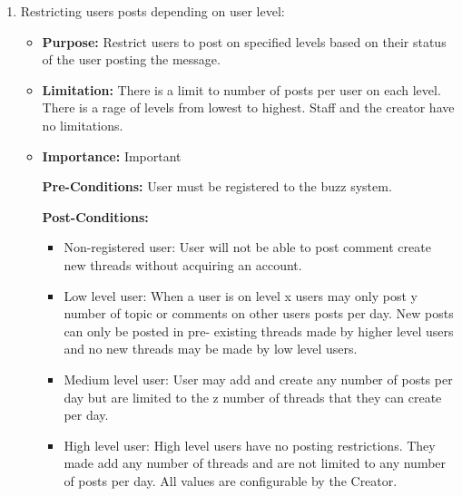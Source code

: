 \documentclass[11pt]{article}
\begin{document}
\begin{enumerate}
\item  Restricting users posts depending on user level:
\begin{itemize}	
		\item
		\textbf{Purpose:}
		\newline
		Restrict users to post on specified levels based on their status of the user posting the message.
		\item\textbf{Limitation: }
		\newline
		 There is a limit to number of posts per user on each level.
		 There is a rage of levels from lowest to highest.
		 Staff and the creator have no limitations.
		\item\textbf{Importance:} 
		\newline Important

		\textbf{Pre-Conditions: }
		\newline
		 User must be registered to the buzz system.
	
		\textbf{Post-Conditions: }
		\begin{itemize}
			\item Non-registered user:
			User will not be able to post comment create new threads without acquiring an account.
			\item Low level user:
			When a user is on level x users may only post y number of topic or comments on other users posts per day. New posts can only be posted in pre-		existing threads made by higher level users and no new threads may be made by low level users. 
			\item Medium level user:
			User may add and create any number of posts per day but are limited to the z number of threads that they can create per day.
			\item High level user:
			High level users have no posting restrictions. They made add any number of threads and are not limited to any number of posts per day.
		 	All values are configurable by the Creator.
		 \end{itemize}


\end{itemize}
\end{enumerate}
\end{document}
